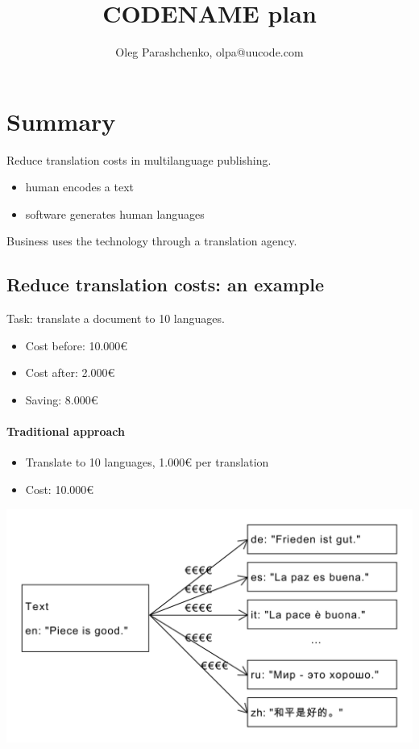 \documentclass{article}
\title{CODENAME plan}
\author{Oleg Parashchenko, olpa@uucode.com}
\begin{document}
\maketitle

\tableofcontents

\section{Summary}
Reduce translation costs in multilanguage publishing.

\begin{itemize}
\item human encodes a text
\item software generates human languages
\end{itemize}

Business uses the technology through a translation agency.


\subsection{Reduce translation costs: an example}

Task: translate a document to 10 languages.

\begin{itemize}
\item Cost before: 10.000€
\item Cost after: 2.000€
\item Saving: 8.000€
\end{itemize}

\paragraph{Traditional approach}

\begin{itemize}
\item Translate to 10 languages, 1.000€ per translation
\item Cost: 10.000€
\end{itemize}

\includegraphics[scale=0.4]{dia/user-view-current-world.pdf}
\end{document}
